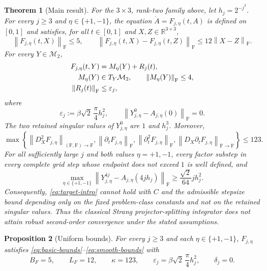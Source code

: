 \documentclass[]{article}
\numberwithin{equation}{section}
\theoremstyle{plain}
\newtheorem{theorem}{Theorem}[section]
\newtheorem{proposition}[theorem]{Proposition}
\theoremstyle{remark}
\newcommand{\F}{\mathrm F}
\newcommand{\norm}[1]{\left\lVert #1\right\rVert}
\newcommand{\eps}{\varepsilon}
\begin{document}
\begin{theorem}[Main result]
\label{thm:main}
For the $3\times3$, rank-two family above, let $h_j=2^{-j^2}$.  For every $j\ge3$ and
$\eta\in\{+1,-1\}$, the equation $\dot A=F_{j,\eta}(t,A)$ is defined
on $[0,1]$ and satisfies, for all $t\in[0,1]$ and
$X,Z\in\mathbb R^{3\times3}$,
\begin{equation}\label{eq:theorem-basic-bounds}
 \norm{F_{j,\eta}(t,X)}_{\F}\le5,
 \qquad
 \norm{F_{j,\eta}(t,X)-F_{j,\eta}(t,Z)}_{\F}
 \le12\norm{X-Z}_{\F}.
\end{equation}
For every $Y\in\mathcal M_2$,
\begin{align}
 F_{j,\eta}(t,Y)&=M_\eta(Y)+R_j(t),\notag\\
 M_\eta(Y)&\in T_Y\mathcal M_2,\qquad
 \norm{M_\eta(Y)}_{\F}\le4,\notag\\
 \norm{R_j(t)}_{\F}&\le\eps_j,
 \label{eq:theorem-normal-bound}
\end{align}
where
\begin{equation}\label{eq:theorem-epsilon}
 \eps_j:=\beta\sqrt2\,\frac\pi4h_j^2,
 \qquad
 \norm{Y^0_{j,\eta}-A_{j,\eta}(0)}_{\F}=0.
\end{equation}
The two retained singular values of $Y^0_{j,\eta}$ are $1$ and
$h_j^3$.
Moreover,
\begin{equation}\label{eq:theorem-smooth-bounds}
 \max\!\left\{
 \norm{D_X^2F_{j,\eta}}_{(\F,\F)\to\F},
 \norm{\partial_tF_{j,\eta}}_{\F},
 \norm{\partial_t^2F_{j,\eta}}_{\F},
 \norm{D_X\partial_tF_{j,\eta}}_{\F\to\F}
 \right\}\le123.
\end{equation}
For all sufficiently large $j$ and both values $\eta=+1,-1$, every
factor substep in every complete grid step whose endpoint does not
exceed $1$ is well defined, and
\begin{equation}\label{eq:main-lower}
 \max_{\eta\in\{+1,-1\}}
 \norm{Y_{j,\eta}^{4j}-A_{j,\eta}(4jh_j)}_{\F}
 \ge \frac{\sqrt2}{64}j h_j^2.
\end{equation}
Consequently, \eqref{eq:target-intro} cannot hold with $C$ and the
admissible stepsize bound depending only on the fixed problem-class
constants and not on the retained singular values.  Thus the classical
Strang projector-splitting integrator does not attain robust
second-order convergence under the stated assumptions.
\end{theorem}

\begin{proposition}[Uniform bounds]
\label{prop:family-bounds}
For every $j\ge3$ and each $\eta\in\{+1,-1\}$, $F_{j,\eta}$ satisfies
\eqref{eq:basic-bounds}--\eqref{eq:smooth-bounds} with
\begin{equation}\label{eq:fixed-constants}
 B_F=5,\qquad L_F=12,\qquad \kappa=123,
 \qquad \eps_j=\beta\sqrt2\,\frac{\pi}{4}h_j^2,
 \qquad \delta_j=0.
\end{equation}
\end{proposition}
\end{document}
